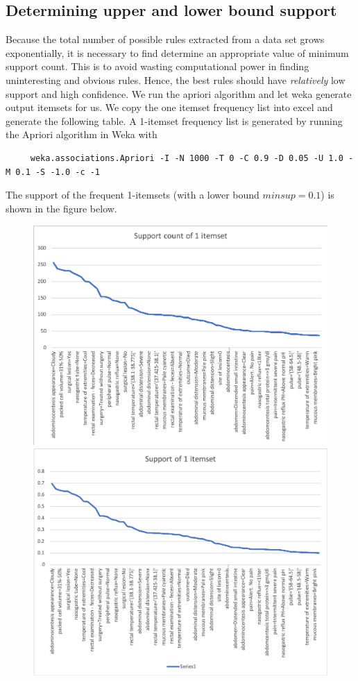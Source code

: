 \subsection{Determining upper and lower bound support}

Because the total number of possible rules extracted
from a data set grows exponentially, it is necessary to find determine an appropriate value of minimum support count. This is to avoid wasting computational power in finding uninteresting and obvious rules.
Hence, the best rules should have \textit{relatively} low support and high confidence.
We run the apriori algorithm and let weka generate output itemsets for us.  We copy the one itemset frequency list into excel and generate the following table.
A 1-itemset frequency list is generated by running the Apriori algorithm in Weka with
\begin{verbatim}
	 weka.associations.Apriori -I -N 1000 -T 0 -C 0.9 -D 0.05 -U 1.0 -M 0.1 -S -1.0 -c -1
\end{verbatim}
The support of the frequent 1-itemsets (with a lower bound $minsup = 0.1$) is shown in the figure below.

\begin{figure}[H]
\includegraphics[scale=0.7]{SupportCountTable.png}

\includegraphics[scale=0.7]{SupportTable.png}
\end{figure}

